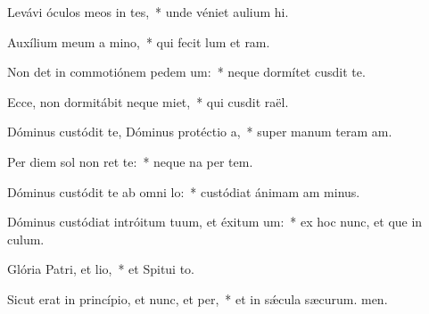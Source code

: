 \item Levávi óculos meos in tes,~* unde véniet aulium hi.
\item Auxílium meum a mino,~* qui fecit lum et ram.
\item Non det in commotiónem pedem um:~* neque dormítet  cusdit te.
\item Ecce, non dormitábit neque miet,~* qui cusdit raël.
\item Dóminus custódit te, Dóminus protéctio a,~* super manum teram am.
\item Per diem sol non ret te:~* neque na per tem.
\item Dóminus custódit te ab omni lo:~* custódiat ánimam am minus.
\item Dóminus custódiat intróitum tuum, et éxitum um:~* ex hoc nunc, et que in culum.
\item Glória Patri, et lio,~* et Spitui to.
\item Sicut erat in princípio, et nunc, et per,~* et in sǽcula sæcurum. men.
